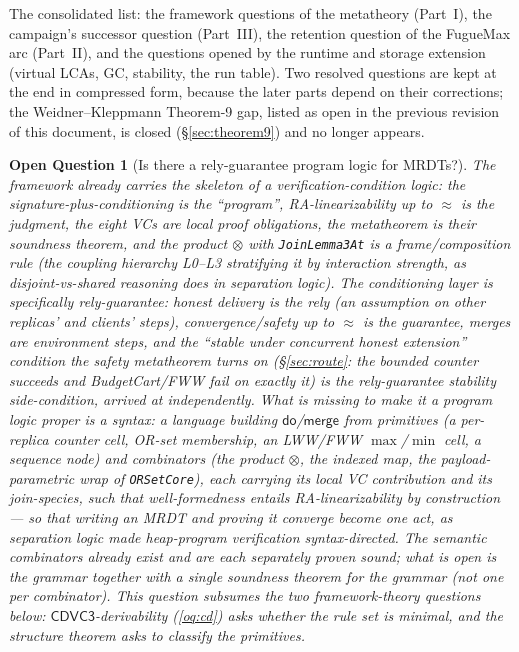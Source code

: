 \documentclass[11pt]{article}
\newtheorem{openq}[theorem]{Open Question}
\newcommand{\cd}{\mathsf{CDVC3}}
\newcommand{\lean}[1]{\texttt{#1}}
\newcommand{\dodo}{\mathsf{do}}
\newcommand{\merge}{\mathsf{merge}}
\newcommand{\eqobs}{\approx}
\begin{document}
The consolidated list: the framework questions of the metatheory
(Part~I), the campaign's successor question (Part~III), the retention
question of the FugueMax arc (Part~II), and the questions opened by the
runtime and storage extension (virtual LCAs, GC, stability, the run
table). Two resolved questions are kept at the end in compressed form,
because the later parts depend on their corrections; the
Weidner--Kleppmann Theorem-9 gap, listed as open in the previous
revision of this document, is closed (\S\ref{sec:theorem9}) and no
longer appears.

\begin{openq}[Is there a rely-guarantee program logic for MRDTs?]
\label{oq:proglogic}
The framework already carries the skeleton of a verification-condition logic:
the signature-plus-conditioning is the ``program'', RA-linearizability up to
$\eqobs$ is the judgment, the eight VCs are local proof obligations, the
metatheorem is their \emph{soundness theorem}, and the product $\otimes$ with
\lean{JoinLemma3At} is a frame/composition rule (the coupling hierarchy
L0--L3 stratifying it by interaction strength, as disjoint-vs-shared
reasoning does in separation logic). The conditioning layer is specifically
\emph{rely-guarantee}: honest delivery is the \emph{rely} (an assumption on
other replicas' and clients' steps), convergence/safety up to $\eqobs$ is the
\emph{guarantee}, merges are environment steps, and the ``stable under
concurrent honest extension'' condition the safety metatheorem turns on
(\S\ref{sec:route}: the bounded counter succeeds and
BudgetCart/FWW fail on exactly it) \emph{is} the rely-guarantee stability
side-condition, arrived at independently. What is missing to make it a
program logic proper is a \emph{syntax}: a language building $\dodo$/$\merge$
from primitives (a per-replica counter cell, OR-set membership, an LWW/FWW
$\max$/$\min$ cell, a sequence node) and combinators (the product $\otimes$,
the indexed map, the payload-parametric wrap of \lean{ORSetCore}), each
carrying its local VC contribution and its join-species, such that
well-formedness entails RA-linearizability \emph{by construction} --- so that
writing an MRDT and proving it converge become one act, as separation logic
made heap-program verification syntax-directed. The \emph{semantic}
combinators already exist and are each \emph{separately} proven sound; what
is open is the grammar together with a \emph{single} soundness theorem for
the grammar (not one per combinator). This question subsumes the two
framework-theory questions below: $\cd$-derivability (\ref{oq:cd}) asks
whether the rule set is minimal, and the structure theorem asks to classify
the primitives.
\end{openq}
\end{document}

